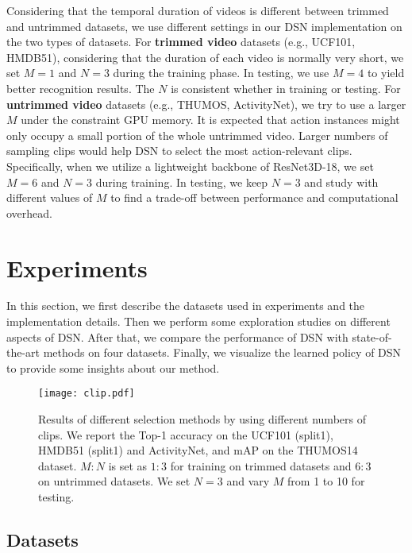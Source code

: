 \documentclass[journal]{IEEEtran}
\begin{document}
Considering that the temporal duration of videos is different between trimmed and untrimmed datasets, we use different settings in our DSN implementation on the two types of datasets.
For {\bf trimmed video} datasets (e.g., UCF101, HMDB51), considering that the duration of each video is normally very short, we set $M=1$ and $N=3$ during the training phase. In testing, we use $M=4$ to yield better recognition results. The $N$ is consistent whether in training or testing.
For {\bf untrimmed video} datasets (e.g., THUMOS, ActivityNet), we try to use a larger $M$ under the constraint GPU memory. It is expected that action instances might only occupy a small portion of the whole untrimmed video. Larger numbers of sampling clips would help DSN to select the most action-relevant clips. Specifically,  when we utilize a lightweight backbone of ResNet3D-18,  we set $M=6$ and $N=3$ during training.
In testing, we keep $N=3$ and study with different values of $M$ to find a trade-off between performance and computational overhead.

\section{Experiments}
\label{sec:exp}

In this section, we first describe the datasets used in experiments and the implementation details.
Then we perform some exploration studies on different aspects of DSN.
After that, we compare the performance of DSN with state-of-the-art methods on four datasets.
Finally, we visualize the learned policy of DSN to provide some insights about our method.



\begin{figure*}[t]
  \centering
  \texttt{[image: clip.pdf]}
  \caption{Results of different selection methods by using different numbers of clips. We report the Top-1 accuracy on the UCF101 (split1), HMDB51 (split1) and ActivityNet, and mAP on the THUMOS14 dataset. $M:N$ is set as $1:3$ for training on trimmed datasets and $6:3$ on untrimmed datasets. We set $N=3$ and vary $M$ from 1 to 10 for testing.}
  \label{fig:clip}
\end{figure*}



\subsection{Datasets}
\label{subec:datasets}
\end{document}
